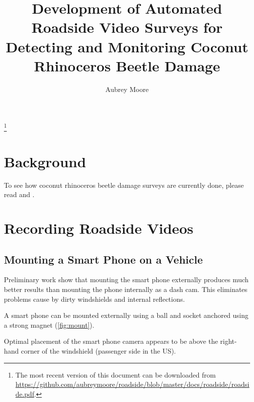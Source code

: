 \documentclass[12pt,letterpaper,english,bibliography=totocnumbered, abstract=on]{scrartcl}
\begin{document}
\titlehead{TECHNICAL REPORT}

\title{Development of Automated Roadside Video Surveys for Detecting and Monitoring Coconut Rhinoceros Beetle Damage}


\author{Aubrey Moore}

\maketitle

\footnote{The most recent version of this document can be downloaded from\\
	\url{https://github.com/aubreymoore/roadside/blob/master/docs/roadside/roadside.pdf}.}

\newpage

\tableofcontents
\lstlistoflistings
\listoffigures

\newpage

\section{Background}

To see how coconut rhinoceros beetle damage surveys are currently done, please read \cite{jackson_rhinoceros_2019-1} and \cite{vaqalo_coconut_2017}.

\section{Recording Roadside Videos}

\subsection{Mounting a Smart Phone on a Vehicle}

Preliminary work show that mounting the smart phone externally produces much better results than mounting the phone internally as a dash cam. This eliminates problems cause by dirty windshields and internal reflections.  

A smart phone can be mounted externally using a ball and socket anchored using a strong magnet (\ref{fig:mount}).

Optimal placement of the smart phone camera appears to be above the right-hand corner of the windshield (passenger side in the US). 
\end{document}
